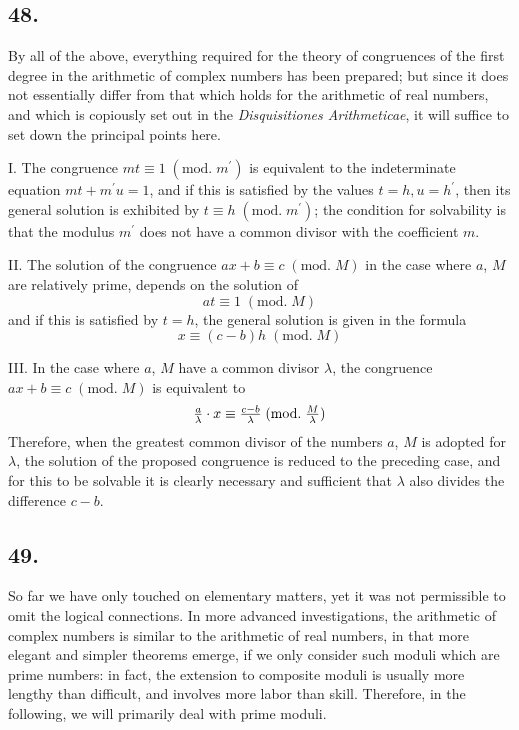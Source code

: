 \documentclass[twoside,12pt]{memoir}
\renewcommand{\pmod}[1]{\;(\textrm{mod.}\;#1)}
\let\oldfrac\frac
\def\frac#1#2{\mathchoice{\tfrac{#1}{#2}}{\oldfrac{#1}{#2}}{\genfrac{}{}{}{2}{#1}{#2\mathstrut}}{\genfrac{}{}{}{3}{#1}{#2\mathstrut}}}
\begin{document}
\subsection*{48.}

By all of the above, everything required for the theory of congruences of the first degree in the arithmetic of complex numbers has been prepared; but since it \pagebreak%
does not essentially differ from that which holds for the arithmetic of real numbers, and which is copiously set out in the \textit{Disquisitiones Arithmeticae}, it will suffice to set down the principal points here.

I. The congruence \(m t \equiv 1\pmod{m^{\prime}}\) is equivalent to the indeterminate equation \(m t+m^{\prime} u=1\), and if this is satisfied by the values \(t=h, u=h^{\prime}\), then its general solution is exhibited by \(t \equiv h\pmod{m^{\prime}}\); the condition for solvability is that the modulus \(m^{\prime}\) does not have a common divisor with the coefficient \(m\).

II. The solution of the congruence \(a x+b \equiv c\pmod{M}\) in the case where \(a\), \(M\) are relatively prime, depends on the solution of
\[a t \equiv 1\pmod{M}\]
and if this is satisfied by \(t=h\), the general solution is given in the formula
\[x \equiv(c-b) h\pmod{M}\]

III. In the case where \(a\), \(M\) have a common divisor \(\lambda\), the congruence \(a x+b \equiv c\pmod{M}\) is equivalent to
\[\frac{a}{\lambda} \cdot x \equiv \frac{c-b}{\lambda}\pmod{\frac{M}{\lambda}}\]
Therefore, when the greatest common divisor of the numbers \(a\), \(M\) is adopted for \(\lambda\), the solution of the proposed congruence is reduced to the preceding case, and for this to be solvable it is clearly necessary and sufficient that \(\lambda\) also divides the difference \(c-b\).

\subsection*{49.}

So far we have only touched on elementary matters, yet it was not permissible to omit the logical connections. In more advanced investigations, the arithmetic of complex numbers is similar to the arithmetic of real numbers, in that more elegant and simpler theorems emerge, if we only consider such moduli which are prime numbers: in fact, the extension to composite moduli is usually more lengthy than difficult, and involves more labor than skill. Therefore, in the following, we will primarily deal with prime moduli.
\end{document}
